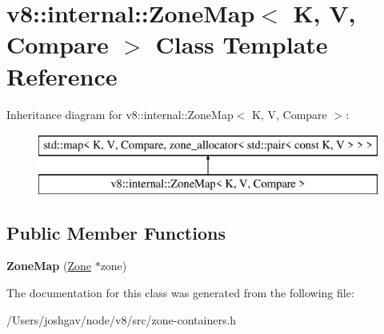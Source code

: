 \hypertarget{classv8_1_1internal_1_1_zone_map}{}\section{v8\+:\+:internal\+:\+:Zone\+Map$<$ K, V, Compare $>$ Class Template Reference}
\label{classv8_1_1internal_1_1_zone_map}
Inheritance diagram for v8\+:\+:internal\+:\+:Zone\+Map$<$ K, V, Compare $>$\+:\begin{figure}[H]
\begin{center}
\leavevmode
\includegraphics[height=2.000000cm]{classv8_1_1internal_1_1_zone_map}
\end{center}
\end{figure}
\subsection*{Public Member Functions}
\begin{DoxyCompactItemize}
\item 
{\bfseries Zone\+Map} (\hyperlink{classv8_1_1internal_1_1_zone}{Zone} $\ast$zone)\hypertarget{classv8_1_1internal_1_1_zone_map_ae0cc3bdb7c66e2ae32977fb0bdfebaf8}{}\label{classv8_1_1internal_1_1_zone_map_ae0cc3bdb7c66e2ae32977fb0bdfebaf8}

\end{DoxyCompactItemize}


The documentation for this class was generated from the following file\+:\begin{DoxyCompactItemize}
\item 
/\+Users/joshgav/node/v8/src/zone-\/containers.\+h\end{DoxyCompactItemize}
